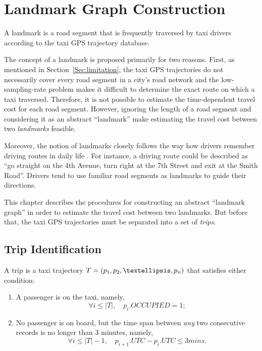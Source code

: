 \chapter{Landmark Graph Construction}\label{Chap:3}
\begin{defn}\label{Def:ldmk}
A landmark is a road segment that is frequently traversed by taxi drivers according to the taxi GPS trajectory database. \cite{TDR10}
\end{defn}

The concept of a landmark is proposed primarily for two reasons. First, as mentioned in Section~\ref{Sec:limitation}, the taxi GPS trajectories do not necessarily cover every road segment in a city's road network and the low-sampling-rate problem makes it difficult to determine the exact route on which a taxi traversed. Therefore, it is not possible to estimate the time-dependent travel cost for each road segment. However, igno\-ring the length of a road segment and considering it as an abstract ``landmark'' make estimating the travel cost between two \emph{landmarks} feasible. 

Moreover, the notion of landmarks closely follows the way how drivers remember driving routes in daily life \cite{TDR10}. For instance, a driving route could be described as ``go straight on the 4th Avenue, turn right at the 7th Street and exit at the Smith Road''. Drivers tend to use familiar road segments as landmarks to guide their directions.

This chapter describes the procedures for constructing an abstract ``landmark graph'' in order to estimate the travel cost between two landmarks. But before that, the taxi GPS trajectories must be separated into a set of \emph{trips}.

\section{Trip Identification}
\begin{defn}\label{Def:trip}
A trip is a taxi trajectory $T = (p_1,p_2,\textellipsis,p_n)$ that satisfies either condition:
\begin{enumerate}
\item A passenger is on the taxi, namely, 
\begin{equation}
\forall i \leq |T|, \quad p_{i}.OCCUPIED = 1;
\end{equation}
\item No passenger is on board, but the time span between \emph{any} two consecutive records is no longer than 3 minutes, namely, 
\begin{equation}
\forall i \leq |T| - 1, \quad p_{i + 1}.UTC - p_{i}.UTC \leq 3 mins.
\end{equation}
\end{enumerate}
\end{defn}


